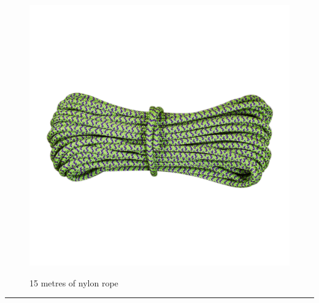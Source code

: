 \documentclass{article}
\begin{document}
    \begin{figure}[H]
        \centering
        \begin{minipage}{0.25\textwidth}
            \centering
            \includegraphics[width=\textwidth]{../SurvivalItemImages/rope}
        \end{minipage}\hfill
        \begin{minipage}{0.7\textwidth}
            \centering
            \Large 15 metres of nylon rope
        \end{minipage}
    \end{figure}
    \vspace{-0.8em}
    \noindent\rule{\textwidth}{0.4pt}
            
\end{document}
